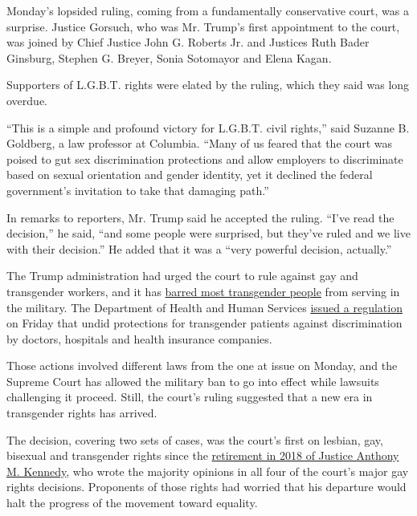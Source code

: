 Monday's lopsided ruling, coming from a fundamentally conservative
court, was a surprise. Justice Gorsuch, who was Mr. Trump's first
appointment to the court, was joined by Chief Justice John G. Roberts
Jr. and Justices Ruth Bader Ginsburg, Stephen G. Breyer, Sonia Sotomayor
and Elena Kagan.

Supporters of L.G.B.T. rights were elated by the ruling, which they said
was long overdue.

``This is a simple and profound victory for L.G.B.T. civil rights,''
said Suzanne B. Goldberg, a law professor at Columbia. ``Many of us
feared that the court was poised to gut sex discrimination protections
and allow employers to discriminate based on sexual orientation and
gender identity, yet it declined the federal government's invitation to
take that damaging path.''

In remarks to reporters, Mr. Trump said he accepted the ruling. ``I've
read the decision,'' he said, ``and some people were surprised, but
they've ruled and we live with their decision.'' He added that it was a
``very powerful decision, actually.''

The Trump administration had urged the court to rule against gay and
transgender workers, and it has
\href{https://www.nytimes3xbfgragh.onion/2019/01/22/us/politics/transgender-ban-military-supreme-court.html}{barred
most transgender people} from serving in the military. The Department of
Health and Human Services
\href{https://www.nytimes3xbfgragh.onion/2020/06/12/us/politics/trump-transgender-rights.html}{issued
a regulation} on Friday that undid protections for transgender patients
against discrimination by doctors, hospitals and health insurance
companies.

Those actions involved different laws from the one at issue on Monday,
and the Supreme Court has allowed the military ban to go into effect
while lawsuits challenging it proceed. Still, the court's ruling
suggested that a new era in transgender rights has arrived.

The decision, covering two sets of cases, was the court's first on
lesbian, gay, bisexual and transgender rights since the
\href{https://www.nytimes3xbfgragh.onion/2018/06/27/us/politics/anthony-kennedy-retire-supreme-court.html?module=inline}{retirement
in 2018 of Justice Anthony M. Kennedy}, who wrote the majority opinions
in all four of the court's major gay rights decisions. Proponents of
those rights had worried that his departure would halt the progress of
the movement toward equality.

